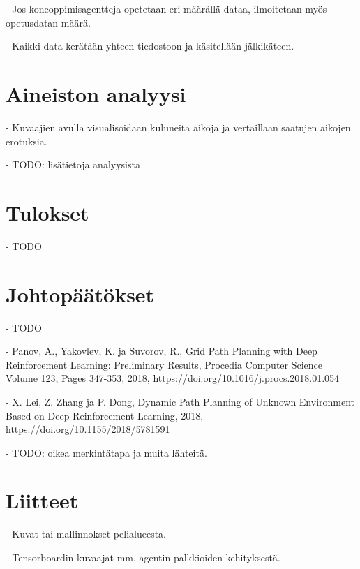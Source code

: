 \documentclass[utf8]{gradu3}
\begin{document}
- Jos koneoppimisagentteja opetetaan eri määrällä dataa, ilmoitetaan myös opetusdatan määrä.

- Kaikki data kerätään yhteen tiedostoon ja käsitellään jälkikäteen.

\chapter{Aineiston analyysi}

- Kuvaajien avulla visualisoidaan kuluneita aikoja ja vertaillaan saatujen aikojen erotuksia.

- TODO: lisätietoja analyysista

\chapter{Tulokset}

- TODO

\chapter{Johtopäätökset}

- TODO

\printbibliography

- Panov, A., Yakovlev, K. ja Suvorov, R., Grid Path Planning with Deep
Reinforcement Learning: Preliminary Results, Procedia Computer Science
Volume 123, Pages 347-353, 2018,
https://doi.org/10.1016/j.procs.2018.01.054

- X. Lei, Z. Zhang ja P. Dong, Dynamic Path Planning of Unknown
Environment Based on Deep Reinforcement Learning, 2018,
https://doi.org/10.1155/2018/5781591

- TODO: oikea merkintätapa ja muita lähteitä.

\chapter{Liitteet}

- Kuvat tai mallinnokset pelialueesta.

- Tensorboardin kuvaajat mm. agentin palkkioiden kehityksestä.
\end{document}
